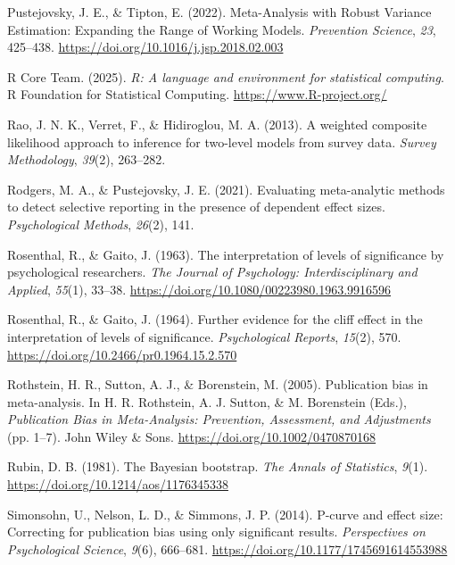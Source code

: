 \documentclass[
  american,
  man, donotrepeattitle,floatsintext]{apa7}
\newlength{\cslhangindent}
\newenvironment{CSLReferences}[2] %
 {\begin{list}{}{%
  \setlength{\itemindent}{0pt}
  \setlength{\leftmargin}{0pt}
  \setlength{\parsep}{0pt}
  \ifodd #1
   \setlength{\leftmargin}{\cslhangindent}
   \setlength{\itemindent}{-1\cslhangindent}
  \fi
  \setlength{\itemsep}{#2\baselineskip}}}
 {\end{list}}
\begin{document}
\begin{CSLReferences}{1}{0}
Pustejovsky, J. E., \& Tipton, E. (2022). Meta-Analysis with Robust Variance Estimation: {Expanding} the Range of Working Models. \emph{Prevention Science}, \emph{23}, 425--438. \url{https://doi.org/10.1016/j.jsp.2018.02.003}

R Core Team. (2025). \emph{R: A language and environment for statistical computing}. R Foundation for Statistical Computing. \url{https://www.R-project.org/}

Rao, J. N. K., Verret, F., \& Hidiroglou, M. A. (2013). A weighted composite likelihood approach to inference for two-level models from survey data. \emph{Survey Methodology}, \emph{39}(2), 263--282.

Rodgers, M. A., \& Pustejovsky, J. E. (2021). Evaluating meta-analytic methods to detect selective reporting in the presence of dependent effect sizes. \emph{Psychological Methods}, \emph{26}(2), 141.

Rosenthal, R., \& Gaito, J. (1963). The interpretation of levels of significance by psychological researchers. \emph{The Journal of Psychology: Interdisciplinary and Applied}, \emph{55}(1), 33--38. \url{https://doi.org/10.1080/00223980.1963.9916596}

Rosenthal, R., \& Gaito, J. (1964). Further evidence for the cliff effect in the interpretation of levels of significance. \emph{Psychological Reports}, \emph{15}(2), 570. \url{https://doi.org/10.2466/pr0.1964.15.2.570}

Rothstein, H. R., Sutton, A. J., \& Borenstein, M. (2005). Publication bias in meta-analysis. In H. R. Rothstein, A. J. Sutton, \& M. Borenstein (Eds.), \emph{Publication {Bias} in {Meta-Analysis}: {Prevention}, {Assessment}, and {Adjustments}} (pp. 1--7). {John Wiley \& Sons}. \url{https://doi.org/10.1002/0470870168}

Rubin, D. B. (1981). The {Bayesian} bootstrap. \emph{The Annals of Statistics}, \emph{9}(1). \url{https://doi.org/10.1214/aos/1176345338}

Simonsohn, U., Nelson, L. D., \& Simmons, J. P. (2014). P-curve and effect size: Correcting for publication bias using only significant results. \emph{Perspectives on Psychological Science}, \emph{9}(6), 666--681. \url{https://doi.org/10.1177/1745691614553988}


\end{CSLReferences}
\end{document}
